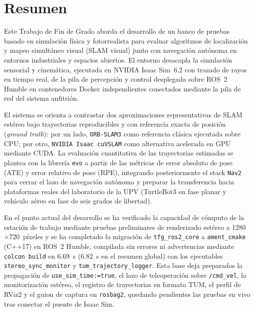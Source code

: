 \chapter*{Resumen}

Este Trabajo de Fin de Grado aborda el desarrollo de un banco de pruebas basado en simulación física y fotorrealista para evaluar algoritmos de localización y mapeo simultáneo visual (SLAM visual) junto con navegación autónoma en entornos industriales y espacios abiertos. El entorno desacopla la simulación sensorial y cinemática, ejecutada en NVIDIA Isaac Sim~6.2 con trazado de rayos en tiempo real, de la pila de percepción y control desplegada sobre ROS~2 Humble en contenedores Docker independientes conectados mediante la pila de red del sistema anfitrión.

El sistema se orienta a contrastar dos aproximaciones representativas de SLAM estéreo bajo trayectorias reproducibles y con referencia exacta de posición (\textit{ground truth}): por un lado, \texttt{ORB-SLAM3} como referencia clásica ejecutada sobre CPU; por otro, \texttt{NVIDIA Isaac cuVSLAM} como alternativa acelerada en GPU mediante CUDA. La evaluación cuantitativa de las trayectorias estimadas se plantea con la librería \texttt{evo} a partir de las métricas de error absoluto de pose (ATE) y error relativo de pose (RPE), integrando posteriormente el stack \texttt{Nav2} para cerrar el lazo de navegación autónoma y preparar la transferencia hacia plataformas reales del laboratorio de la UPV (TurtleBot3 en fase planar y vehículo aéreo en fase de seis grados de libertad).

En el punto actual del desarrollo se ha verificado la capacidad de cómputo de la estación de trabajo mediante pruebas preliminares de renderizado estéreo a \num{1280}\(\times\)\num{720}~píxeles y se ha completado la migración de \texttt{tfg\_ros2\_core} a \texttt{ament\_cmake} (C++17) en ROS~2 Humble, compilada sin errores ni advertencias mediante \texttt{colcon build} en \qty{6.69}{\second} (\qty{6.82}{\second} en el resumen global) con los ejecutables \texttt{stereo\_sync\_monitor} y \texttt{tum\_trajectory\_logger}. Esta base deja preparados la propagación de \texttt{use\_sim\_time:=true}, el lazo de teleoperación sobre \texttt{/cmd\_vel}, la monitorización estéreo, el registro de trayectorias en formato TUM, el perfil de RViz2 y el guion de captura en \texttt{rosbag2}, quedando pendientes las pruebas en vivo tras conectar el puente de Isaac Sim.

